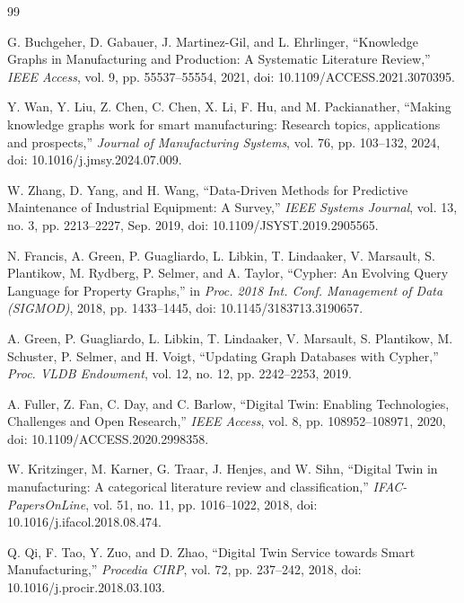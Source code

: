 
\begin{thebibliography}{99}

G. Buchgeher, D. Gabauer, J. Martinez-Gil, and L. Ehrlinger, ``Knowledge Graphs in Manufacturing and Production: A Systematic Literature Review,'' \textit{IEEE Access}, vol. 9, pp. 55537--55554, 2021, doi: 10.1109/ACCESS.2021.3070395.

Y. Wan, Y. Liu, Z. Chen, C. Chen, X. Li, F. Hu, and M. Packianather, ``Making knowledge graphs work for smart manufacturing: Research topics, applications and prospects,'' \textit{Journal of Manufacturing Systems}, vol. 76, pp. 103--132, 2024, doi: 10.1016/j.jmsy.2024.07.009.

W. Zhang, D. Yang, and H. Wang, ``Data-Driven Methods for Predictive Maintenance of Industrial Equipment: A Survey,'' \textit{IEEE Systems Journal}, vol. 13, no. 3, pp. 2213--2227, Sep. 2019, doi: 10.1109/JSYST.2019.2905565.

N. Francis, A. Green, P. Guagliardo, L. Libkin, T. Lindaaker, V. Marsault, S. Plantikow, M. Rydberg, P. Selmer, and A. Taylor, ``Cypher: An Evolving Query Language for Property Graphs,'' in \textit{Proc. 2018 Int. Conf. Management of Data (SIGMOD)}, 2018, pp. 1433--1445, doi: 10.1145/3183713.3190657.

A. Green, P. Guagliardo, L. Libkin, T. Lindaaker, V. Marsault, S. Plantikow, M. Schuster, P. Selmer, and H. Voigt, ``Updating Graph Databases with Cypher,'' \textit{Proc. VLDB Endowment}, vol. 12, no. 12, pp. 2242--2253, 2019.

A. Fuller, Z. Fan, C. Day, and C. Barlow, ``Digital Twin: Enabling Technologies, Challenges and Open Research,'' \textit{IEEE Access}, vol. 8, pp. 108952--108971, 2020, doi: 10.1109/ACCESS.2020.2998358.

W. Kritzinger, M. Karner, G. Traar, J. Henjes, and W. Sihn, ``Digital Twin in manufacturing: A categorical literature review and classification,'' \textit{IFAC-PapersOnLine}, vol. 51, no. 11, pp. 1016--1022, 2018, doi: 10.1016/j.ifacol.2018.08.474.

Q. Qi, F. Tao, Y. Zuo, and D. Zhao, ``Digital Twin Service towards Smart Manufacturing,'' \textit{Procedia CIRP}, vol. 72, pp. 237--242, 2018, doi: 10.1016/j.procir.2018.03.103.


\end{thebibliography}
